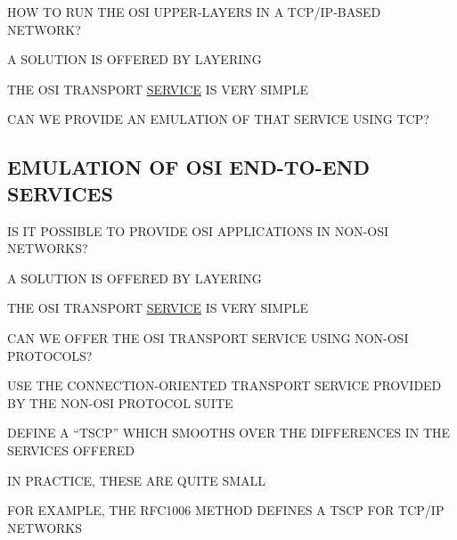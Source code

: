 \begin{bwslide}

\begin{nrtc}
\item	HOW TO RUN THE OSI UPPER-LAYERS IN A TCP/IP-BASED NETWORK?

\item	A SOLUTION IS OFFERED BY LAYERING
    \begin{nrtc}
    \item	THE OSI TRANSPORT \underline{SERVICE} IS VERY SIMPLE

    \item	CAN WE PROVIDE AN EMULATION OF THAT SERVICE USING TCP?
    \end{nrtc}
\end{nrtc}
\end{bwslide}


\begin{bwslide}
\part*	{EMULATION OF OSI END-TO-END SERVICES}\bf

\begin{nrtc}
\item	IS IT POSSIBLE TO PROVIDE OSI APPLICATIONS IN NON-OSI NETWORKS?

\item	A SOLUTION IS OFFERED BY LAYERING
    \begin{nrtc}
    \item	THE OSI TRANSPORT \underline{SERVICE} IS VERY SIMPLE
    \end{nrtc}

\item	CAN WE OFFER THE OSI TRANSPORT SERVICE USING NON-OSI PROTOCOLS?
\end{nrtc}
\end{bwslide}




\begin{bwslide}

\begin{nrtc}
\item	USE THE CONNECTION-ORIENTED TRANSPORT SERVICE PROVIDED BY
	THE NON-OSI PROTOCOL SUITE

\item	DEFINE A ``TSCP'' WHICH SMOOTHS OVER THE DIFFERENCES IN THE SERVICES
	OFFERED
    \begin{nrtc}
    \item	IN PRACTICE, THESE ARE QUITE SMALL
    \end{nrtc}

\item	FOR EXAMPLE, THE RFC1006 METHOD DEFINES A TSCP FOR TCP/IP NETWORKS
\end{nrtc}
\end{bwslide}


